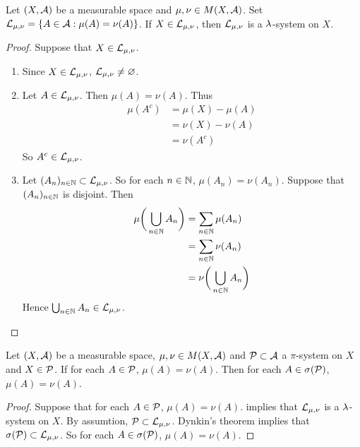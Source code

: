 \documentclass{book}
\begin{document}
	\begin{ex}  
		Let $(X, \mathcal{A})$ be a measurable space and $\mu, \nu \in M(X, \mathcal{A})$. Set $\mathcal{L}_{\mu,\nu} = \{A \in \mathcal{A}: \mu(A) = \nu(A)\}$. If $X \in \mathcal{L}_{\mu, \nu}$, then $\mathcal{L}_{\mu, \nu}$ is a $\lambda$-system on $X$.
	\end{ex}
	
	\begin{proof} Suppose that  $X \in \mathcal{L}_{\mu, \nu}$.
		\begin{enumerate}
			\item Since $X \in \mathcal{L}_{\mu, \nu}$, $\mathcal{L}_{\mu, \nu} \neq \varnothing$.
			\item Let $A \in \mathcal{L}_{\mu, \nu}$. Then $\mu(A) = \nu(A)$. Thus 
			\begin{align*}
				\mu(A^c) 
				&= \mu(X)-\mu(A) \\
				&= \nu(X) -\nu(A) \\
				&= \nu(A^c)
			\end{align*}
			So $A^c \in \mathcal{L}_{\mu, \nu}$. 
			\item Let $(A_n)_{n \in \mathbb{N}} \subset \mathcal{L}_{\mu, \nu}$. So for each $n \in \mathbb{N}$, $\mu(A_n) = \nu(A_n)$.  Suppose that $(A_n)_{n \in \mathbb{N}}$ is disjoint. Then 
			\begin{align*}
				\mu\bigg(\bigcup_{n \in \mathbb{N}} A_n\bigg) 
				&= \sum_{n \in \mathbb{N}} \mu(A_n) \\
				&= \sum_{n \in \mathbb{N}} \nu(A_n) \\
				&= \nu\bigg(\bigcup_{n \in \mathbb{N}} A_n\bigg) 
			\end{align*}
			Hence $\bigcup_{n \in \mathbb{N}} A_n \in \mathcal{L}_{\mu, \nu}$.
		\end{enumerate}
	\end{proof}
	
	\begin{ex}  
		Let $(X, \mathcal{A})$ be a measurable space, $\mu, \nu \in M(X, \mathcal{A})$ and $\mathcal{P} \subset \mathcal{A}$ a $\pi$-system on $X$ and $X \in \mathcal{P}$. If for each $A \in \mathcal{P}$, $\mu(A) = \nu(A)$. Then for each $A \in \sigma(\mathcal{P})$, $\mu(A) = \nu(A)$.
	\end{ex}
	
	\begin{proof}
		Suppose that for each $A \in \mathcal{P}$, $\mu(A) = \nu(A)$.  implies that $\mathcal{L}_{\mu, \nu}$ is a $\lambda$-system on $X$. By assumtion, $\mathcal{P} \subset \mathcal{L}_{\mu, \nu}$. Dynkin's theorem  implies that $\sigma(\mathcal{P}) \subset \mathcal{L}_{\mu, \nu}$. So for each $A \in \sigma(\mathcal{P})$, $\mu(A) = \nu(A)$.
	\end{proof}
\end{document}
